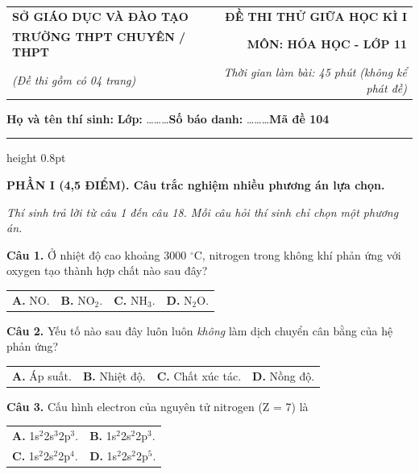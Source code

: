 \documentclass[11pt,a4paper]{article}
\begin{document}
\begin{tabularx}{\textwidth}{@{}l X r@{}}
\textbf{\small SỞ GIÁO DỤC VÀ ĐÀO TẠO} & & \textbf{\small ĐỀ THI THỬ GIỮA HỌC KÌ I} \\
\textbf{\normalsize TRƯỜNG THPT CHUYÊN / THPT} & & \textbf{\normalsize MÔN: HÓA HỌC - LỚP 11} \\
\textit{\small (Đề thi gồm có 04 trang)} & & \textit{\small Thời gian làm bài: 45 phút (không kể phát đề)}
\end{tabularx}

\begin{center}

\textbf{Họ và tên thí sinh:} \dotfill \quad \textbf{Lớp:} \dots\dots\dots \quad \textbf{Số báo danh:} \dots\dots\dots \hfill \textbf{\large Mã đề 104}
\end{center}
\vspace{-4pt}
{\color{gray!50}\hrule height 0.8pt}
\vspace{6pt}

{\color{myGreen}\bfseries\large PHẦN I (4,5 ĐIỂM). Câu trắc nghiệm nhiều phương án lựa chọn.}

\textit{\small Thí sinh trả lời từ câu 1 đến câu 18. Mỗi câu hỏi thí sinh chỉ chọn một phương án.}
\vspace{3pt}

\textbf{Câu 1.} Ở nhiệt độ cao khoảng 3000 $^\circ\text{C}$, nitrogen trong không khí phản ứng với oxygen tạo thành hợp chất nào sau đây?

\begin{tabularx}{\textwidth}{@{}XXXX@{}}
\textbf{A.} NO. & \textbf{B.} NO$_{2}$. & \textbf{C.} NH$_{3}$. & \textbf{D.} N$_{2}$O. \\
\end{tabularx}

\textbf{Câu 2.} Yếu tố nào sau đây luôn luôn \textit{không} làm dịch chuyển cân bằng của hệ phản ứng?

\begin{tabularx}{\textwidth}{@{}XXXX@{}}
\textbf{A.} Áp suất. & \textbf{B.} Nhiệt độ. & \textbf{C.} Chất xúc tác. & \textbf{D.} Nồng độ. \\
\end{tabularx}

\textbf{Câu 3.} Cấu hình electron của nguyên tử nitrogen (Z = 7) là

\begin{tabularx}{\textwidth}{@{}XX@{}}
\textbf{A.} 1s$^{2}$2s$^{3}$2p$^{3}$. & \textbf{B.} 1s$^{2}$2s$^{2}$2p$^{3}$. \\
\textbf{C.} 1s$^{2}$2s$^{2}$2p$^{4}$. & \textbf{D.} 1s$^{2}$2s$^{2}$2p$^{5}$. \\
\end{tabularx}
\end{document}
